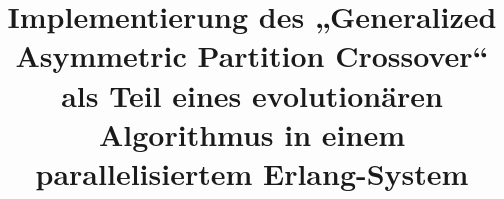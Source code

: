 \title{Implementierung des „Generalized Asymmetric Partition Crossover“
als Teil eines evolutionären Algorithmus in einem parallelisiertem
Erlang-System}
